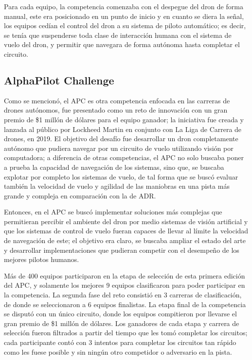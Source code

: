 Para cada equipo, la competencia comenzaba con el despegue del dron de forma manual, este era posicionado en un punto de inicio y en cuanto se diera la señal, los equipos cedían el control del dron a su sistema de piloto automático; es decir, se tenía que suspenderse toda clase de interacción humana con el sistema de vuelo del dron, y permitir que navegara de forma autónoma hasta completar el circuito. 



\subsection{AlphaPilot Challenge}
Como se mencionó, el APC es otra competencia enfocada en las carreras de drones autónomos, fue presentado como un reto de innovación con un gran premio de \$1 millón de dólares para el equipo ganador; la iniciativa fue creada y lanzada al público por Lockheed Martin en conjunto con La Liga de Carrera de drones, en 2019. El objetivo del desafío fue desarrollar un dron completamente autónomo que pudiera navegar por un circuito de vuelo utilizando visión por computadora; a diferencia de otras competencias, el APC no solo buscaba poner a prueba la capacidad de navegación de los sistemas, sino que, se buscaba explotar por completo los sistemas de vuelo, de tal forma que se buscó evaluar también la velocidad de vuelo y agilidad de las maniobras en una pista  más grande y compleja en comparación con la de ADR. 

Entonces, en el APC se buscó implementar soluciones más complejas que permitieran percibir el ambiente del dron por medio sistemas de visión artificial y que los sistemas de control de vuelo fueran capaces de llevar al límite la velocidad de navegación de este; el objetivo era claro, se buscaba ampliar el estado del arte y desarrollar implementaciones que pudieran competir con el desempeño de los mejores pilotos humanos. 

Más de 400 equipos participaron en la etapa de selección de esta primera edición del APC, y solamente los mejores 9 equipos clasificaron para poder participar en la competencia. La segunda fase del reto consistió en 3 carreras de clasificación, de donde se seleccionaron a 6 equipos finalistas. La etapa final de la competencia se disputó con un único circuito, donde los equipos compitieron por llevarse el gran premio de \$1 millón de dólares. Los ganadores de cada etapa y carrera de selección fueron filtrados a partir del tiempo que les tomó completar los circuitos; cada participante contó con 3 intentos para completar los circuitos tan rápido como les fuese posible y sin ningún otro competidor o adversario en la pista.

